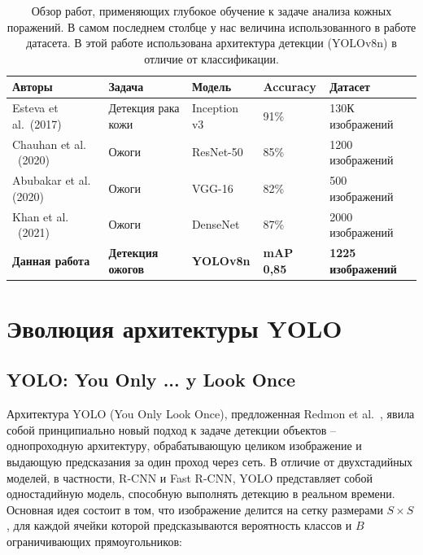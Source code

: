 \begin{table}[H]
\centering
\caption{Обзор работ, применяющих глубокое обучение к задаче анализа кожных поражений. В самом последнем столбце у нас величина использованного в работе датасета. В этой работе использована архитектура детекции (YOLOv8n) в отличие от классификации.}
\label{tab:lit_review}
\begin{tabular}{l p{2.5cm} p{2cm} p{2cm} p{2.5cm}}
\toprule
\textbf{Авторы} & \textbf{Задача} & \textbf{Модель} & \textbf{Accuracy} & \textbf{Датасет} \\
\midrule
Esteva et al.\ (2017)~\cite{esteva2017dermatologist} & Детекция рака кожи & Inception v3 & 91\% & 130К изображений \\
Chauhan et al.
\ (2020)~\cite{chauhan2020burn} & Ожоги & ResNet-50 & 85\% & 1200 изображений \\
Abubakar et al. (2020)~\cite{abubakar2020burn} & Ожоги & VGG-16 & 82\% & 500 изображений \\
Khan et al. \ (2021)~\cite{khan2021burn} & Ожоги & DenseNet & 87\% & 2000 изображений \\
\textbf{Данная работа} & \textbf{Детекция ожогов} & \textbf{YOLOv8n} & \textbf{mAP 0{,}85} & \textbf{1225 изображений} \\
\bottomrule
\end{tabular}
\end{table}

\section{Эволюция архитектуры YOLO}

\subsection{YOLO: You Only ... y Look Once}

Архитектура YOLO (You Only Look Once), предложенная Redmon et al.~\cite{redmon2016yolo}, явила собой принципиально новый подход к задаче детекции объектов -- однопроходную архитектуру, обрабатывающую целиком изображение и выдающую предсказания за один проход через сеть. В отличие от двухстадийных моделей, в частности, R-CNN и Fast R-CNN, YOLO представляет собой одностадийную модель, способную выполнять детекцию в реальном времени. Основная идея состоит в том, что изображение делится на сетку размерами $S \times S$, для каждой ячейки которой предсказываются вероятность классов и $B$ ограничивающих прямоугольников:

